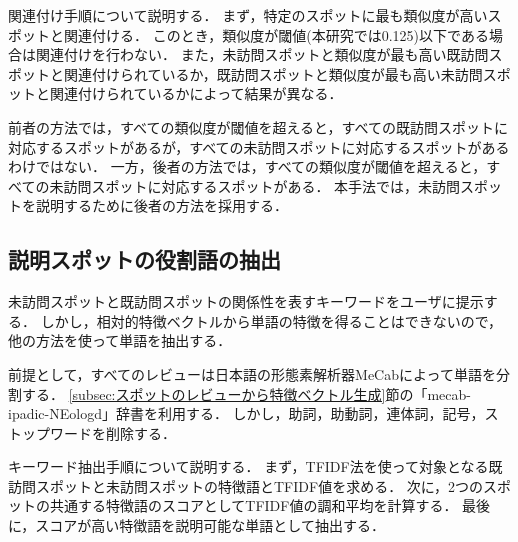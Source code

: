 \documentclass[submit]{ipsj}
\begin{document}
関連付け手順について説明する．
まず，特定のスポットに最も類似度が高いスポットと関連付ける．
このとき，類似度が閾値(本研究では0.125)以下である場合は関連付けを行わない．
また，未訪問スポットと類似度が最も高い既訪問スポットと関連付けられているか，既訪問スポットと類似度が最も高い未訪問スポットと関連付けられているかによって結果が異なる．

前者の方法では，すべての類似度が閾値を超えると，すべての既訪問スポットに対応するスポットがあるが，すべての未訪問スポットに対応するスポットがあるわけではない．
一方，後者の方法では，すべての類似度が閾値を超えると，すべての未訪問スポットに対応するスポットがある．
本手法では，未訪問スポットを説明するために後者の方法を採用する．

\subsection{説明スポットの役割語の抽出}
\label{subsec:説明するための役割語の抽出}
未訪問スポットと既訪問スポットの関係性を表すキーワードをユーザに提示する．
しかし，相対的特徴ベクトルから単語の特徴を得ることはできないので，他の方法を使って単語を抽出する．

前提として，すべてのレビューは日本語の形態素解析器MeCabによって単語を分割する．
\ref{subsec:スポットのレビューから特徴ベクトル生成}節の「mecab-ipadic-NEologd」辞書を利用する．
しかし，助詞，助動詞，連体詞，記号，ストップワードを削除する．

キーワード抽出手順について説明する．
まず，TFIDF法を使って対象となる既訪問スポットと未訪問スポットの特徴語とTFIDF値を求める．
次に，2つのスポットの共通する特徴語のスコアとしてTFIDF値の調和平均を計算する．
最後に，スコアが高い特徴語を説明可能な単語として抽出する．

%
\end{document}
